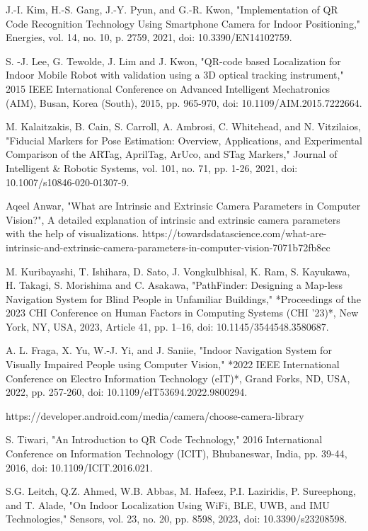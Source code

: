 \begin{thebibliography}{9}
	
	J.-I. Kim, H.-S. Gang, J.-Y. Pyun, and G.-R. Kwon, "Implementation of QR Code Recognition Technology Using Smartphone Camera for Indoor Positioning," Energies, vol. 14, no. 10, p. 2759, 2021, doi: 10.3390/EN14102759.
	
	S. -J. Lee, G. Tewolde, J. Lim and J. Kwon, "QR-code based Localization for Indoor Mobile Robot with validation using a 3D optical tracking instrument," 2015 IEEE International Conference on Advanced Intelligent Mechatronics (AIM), Busan, Korea (South), 2015, pp. 965-970, doi: 10.1109/AIM.2015.7222664.
	
	M. Kalaitzakis, B. Cain, S. Carroll, A. Ambrosi, C. Whitehead, and N. Vitzilaios, "Fiducial Markers for Pose Estimation: Overview, Applications, and Experimental Comparison of the ARTag, AprilTag, ArUco, and STag Markers," Journal of Intelligent \& Robotic Systems, vol. 101, no. 71, pp. 1-26, 2021, doi: 10.1007/s10846-020-01307-9.
	
	Aqeel Anwar, "What are Intrinsic and Extrinsic Camera Parameters in Computer Vision?", A detailed explanation of intrinsic and extrinsic camera parameters with the help of visualizations.
	https://towardsdatascience.com/what-are-intrinsic-and-extrinsic-camera-parameters-in-computer-vision-7071b72fb8ec
	
	M. Kuribayashi, T. Ishihara, D. Sato, J. Vongkulbhisal, K. Ram, S. Kayukawa, H. Takagi, S. Morishima and C. Asakawa, "PathFinder: Designing a Map-less Navigation System for Blind People in Unfamiliar Buildings," *Proceedings of the 2023 CHI Conference on Human Factors in Computing Systems (CHI '23)*, New York, NY, USA, 2023, Article 41, pp. 1–16, doi: 10.1145/3544548.3580687.
	
	A. L. Fraga, X. Yu, W.-J. Yi, and J. Saniie, "Indoor Navigation System for Visually Impaired People using Computer Vision," *2022 IEEE International Conference on Electro Information Technology (eIT)*, Grand Forks, ND, USA, 2022, pp. 257-260, doi: 10.1109/eIT53694.2022.9800294.
	
	https://developer.android.com/media/camera/choose-camera-library
	
	S. Tiwari, "An Introduction to QR Code Technology," 2016 International Conference on Information Technology (ICIT), Bhubaneswar, India, pp. 39-44, 2016, doi: 10.1109/ICIT.2016.021.
	
	 S.G. Leitch, Q.Z. Ahmed, W.B. Abbas, M. Hafeez, P.I. Laziridis, P. Sureephong, and T. Alade, "On Indoor Localization Using WiFi, BLE, UWB, and IMU Technologies," Sensors, vol. 23, no. 20, pp. 8598, 2023, doi: 10.3390/s23208598.
	

\end{thebibliography}

